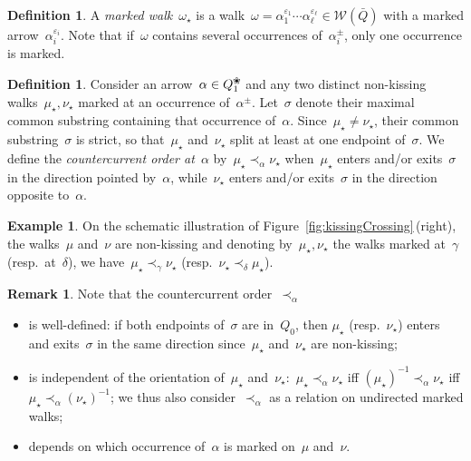 \documentclass{memo-l}
\theoremstyle{definition}
\newtheorem{definition}[theorem]{Definition}
\newtheorem{example}[theorem]{Example}
\newtheorem{remark}[theorem]{Remark}
\newcommand{\fref}[1]{Figure~\ref{#1}} %
\newcommand{\darkblue}{\color{darkblue}} %
\newcommand{\defn}[1]{\textsl{\darkblue #1}} %
\newcommand{\blossom}{^\text{\ding{96}}} %
\newcommand{\walks}{\mathcal{W}} %
\begin{document}
\begin{definition}
A \defn{marked walk}~$\omega_\star$ is a walk~$\omega = \alpha_1^{\varepsilon_1} \cdots \alpha_\ell^{\varepsilon_\ell} \in \walks(\bar Q)$ with a marked arrow~$\alpha_i^{\varepsilon_i}$.
Note that if~$\omega$ contains several occurrences of~$\alpha_i^\pm$, only one occurrence is marked.
\end{definition}

\begin{definition}
Consider an arrow~$\alpha \in Q\blossom_1$ and any two distinct non-kissing walks~$\mu_\star, \nu_\star$ marked at an occurrence of~$\alpha^\pm$.
Let~$\sigma$ denote their maximal common substring containing that occurrence of~$\alpha$.
Since~$\mu_\star \ne \nu_\star$, their common substring~$\sigma$ is strict, so that~$\mu_\star$ and~$\nu_\star$ split at least at one endpoint of~$\sigma$.
We define the \defn{countercurrent order at~$\alpha$} by~$\mu_\star \prec_\alpha \nu_\star$ when~$\mu_\star$ enters and/or exits~$\sigma$ in the direction pointed by~$\alpha$, while~$\nu_\star$ enters and/or exits~$\sigma$ in the direction opposite to~$\alpha$.
\end{definition}

\begin{example}
On the schematic illustration of \fref{fig:kissingCrossing}\,(right), the walks~$\mu$ and~$\nu$ are non-kissing and denoting by~$\mu_\star, \nu_\star$ the walks marked at~$\gamma$ (resp.~at~$\delta$), we have~${\mu_\star \prec_\gamma \nu_\star}$ (resp.~$\nu_\star \prec_\delta \mu_\star$).
\end{example}

\begin{remark}
Note that the countercurrent order~$\prec_\alpha$
\begin{itemize}
\item is well-defined: if both endpoints of~$\sigma$ are in~$Q_0$, then $\mu_\star$ (resp.~$\nu_\star$) enters and exits~$\sigma$ in the same direction since~$\mu_\star$ and~$\nu_\star$ are non-kissing;
\item is independent of the orientation of~$\mu_\star$ and~$\nu_\star$:~$\mu_\star \prec_\alpha \nu_\star$ iff $(\mu_\star)^{-1} \prec_\alpha \nu_\star$ iff $\mu_\star \prec_\alpha (\nu_\star)^{-1}$; we thus also consider~$\prec_\alpha$ as a relation on undirected marked walks;
\item depends on which occurrence of~$\alpha$ is marked on~$\mu$ and~$\nu$.
\end{itemize}
\end{remark}
\end{document}
